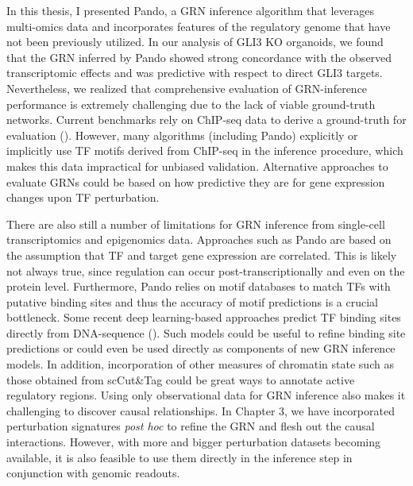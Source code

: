 In this thesis, I presented Pando, a GRN inference algorithm that leverages multi-omics data and incorporates features of the regulatory genome that have not been previously utilized. In our analysis of GLI3 KO organoids, we found that the GRN inferred by Pando showed strong concordance with the observed transcriptomic effects and was predictive with respect to direct GLI3 targets. Nevertheless, we realized that comprehensive evaluation of GRN-inference performance is extremely challenging due to the lack of viable ground-truth networks. Current benchmarks rely on ChIP-seq data to derive a ground-truth for evaluation (\cite{pratapa_benchmarking_2020}). However, many algorithms (including Pando) explicitly or implicitly use TF motifs derived from ChIP-seq in the inference procedure, which makes this data impractical for unbiased validation. Alternative approaches to evaluate GRNs could be based on how predictive they are for gene expression changes upon TF perturbation. 

There are also still a number of limitations for GRN inference from single-cell transcriptomics and epigenomics data. Approaches such as Pando are based on the assumption that TF and target gene expression are correlated. This is likely not always true, since regulation can occur post-transcriptionally and even on the protein level. Furthermore, Pando relies on motif databases to match TFs with putative binding sites and thus the accuracy of motif predictions is a crucial bottleneck. Some recent deep learning-based approaches predict TF binding sites directly from DNA-sequence (\cite{avsec_effective_2021,janssens_decoding_2022}). Such models could be useful to refine binding site predictions or could even be used directly as components of new GRN inference models. In addition, incorporation of other measures of chromatin state such as those obtained from scCut\&Tag could be great ways to annotate active regulatory regions. Using only observational data for GRN inference also makes it challenging to discover causal relationships. In Chapter 3, we have incorporated perturbation signatures \textit{post hoc} to refine the GRN and flesh out the causal interactions. However, with more and bigger perturbation datasets becoming available, it is also feasible to use them directly in the inference step in conjunction with genomic readouts. 

\clearpage

